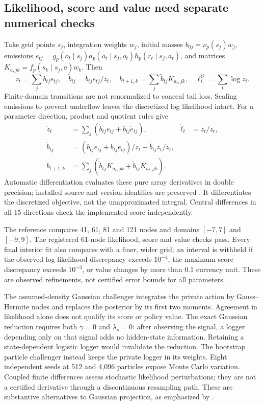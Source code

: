 \subsection{Likelihood, score and value need separate numerical checks}
Take grid points $s_j$, integration weights $w_j$, initial masses
$b_{0j}=\nu_p(s_j)w_j$, emissions
$e_{tj}=g_p(o_t\mid s_j)a_p(a_t\mid s_j,o_t)h_p(r_t\mid s_j,a_t)$,
and matrices $K_{a,jk}=f_p(s_k\mid s_j,a)w_k$. Then
\[
 z_t=\sum_j b_{tj}e_{tj},\quad
 \widetilde b_{tj}=b_{tj}e_{tj}/z_t,\quad
 b_{t+1,k}=\sum_j\widetilde b_{tj}K_{a_t,jk},\quad
 \ell_i^O=\sum_t\log z_t.
\]
Finite-domain transitions are not renormalized to conceal tail loss. Scaling
emissions to prevent underflow leaves the discretized log likelihood intact.
For a parameter direction, product and quotient rules give
\begin{align*}
 \dot z_t&=\sum_j(\dot b_{tj}e_{tj}+b_{tj}\dot e_{tj}),
 &\dot\ell_t&=\dot z_t/z_t,\\
 \dot{\widetilde b}_{tj}&=(\dot b_{tj}e_{tj}+b_{tj}\dot e_{tj})/z_t
                         -\widetilde b_{tj}\dot z_t/z_t,\\
 \dot b_{t+1,k}&=\sum_j(\dot{\widetilde b}_{tj}K_{a_t,jk}
                            +\widetilde b_{tj}\dot K_{a_t,jk}).
\end{align*}
Automatic differentiation evaluates these pure array derivatives in double
precision; installed source and version identities are preserved
\citep{jaxruntime2026}. It differentiates the discretized objective, not the
unapproximated integral. Central differences in all 15 directions check the
implemented score independently.

The reference compares 41, 61, 81 and 121 nodes and domains $[-7,7]$ and
$[-9,9]$. The registered 61-node likelihood, score and value checks pass.
Every final interior fit also compares with a finer, wider grid; an interval
is withheld if the observed log-likelihood discrepancy exceeds $10^{-4}$,
the maximum score discrepancy exceeds $10^{-3}$, or value changes by more
than 0.1 currency unit. These are observed refinements, not certified error
bounds for all parameters.

The assumed-density Gaussian challenger integrates the private action by
Gauss--Hermite nodes and replaces the posterior by its first two moments.
Agreement in likelihood alone does not qualify its score or policy value.
The exact Gaussian reduction requires both $\gamma=0$ and $\lambda_s=0$:
after observing the signal, a logger depending only on that signal adds no
hidden-state information. Retaining a state-dependent logistic logger would
invalidate the reduction. The bootstrap particle challenger instead keeps
the private logger in its weights. Eight independent seeds at 512 and 4,096
particles expose Monte Carlo variation. Coupled finite differences assess
stochastic likelihood perturbations; they are not a certified derivative
through a discontinuous resampling path. These are substantive alternatives
to Gaussian projection, as emphasized by \citet[Chapters 6--7]{sarkka2013}.

